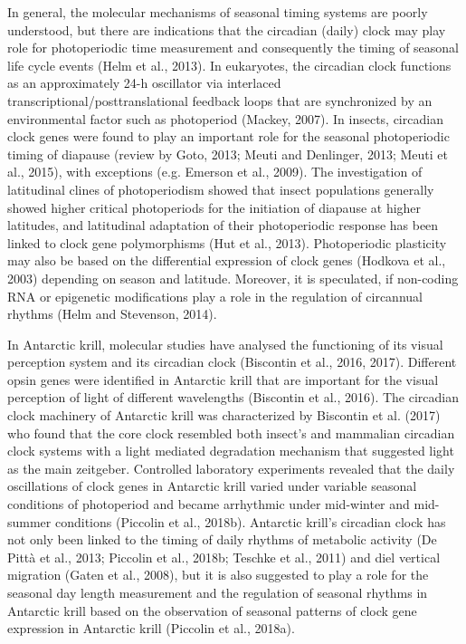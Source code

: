 In general, the molecular mechanisms of seasonal timing systems are poorly understood, but there are indications that the circadian (daily) clock may play role for photoperiodic time measurement and consequently the timing of seasonal life cycle events (Helm et al., 2013). In eukaryotes, the circadian clock functions as an approximately 24-h oscillator via interlaced transcriptional/posttranslational feedback loops that are synchronized by an environmental factor such as photoperiod (Mackey, 2007). In insects, circadian clock genes were found to play an important role for the seasonal photoperiodic timing of diapause (review by Goto, 2013; Meuti and Denlinger, 2013; Meuti et al., 2015), with exceptions (e.g. Emerson et al., 2009). The investigation of latitudinal clines of photoperiodism showed that insect populations generally showed higher critical photoperiods for the initiation of diapause at higher latitudes, and latitudinal adaptation of their photoperiodic response has been linked to clock gene polymorphisms (Hut et al., 2013). Photoperiodic plasticity may also be based on the differential expression of clock genes (Hodkova et al., 2003) depending on season and latitude. Moreover, it is speculated, if non-coding RNA or epigenetic modifications play a role in the regulation of circannual rhythms (Helm and Stevenson, 2014).

In Antarctic krill, molecular studies have analysed the functioning of its visual perception system and its circadian clock (Biscontin et al., 2016, 2017). Different opsin genes were identified in Antarctic krill that are important for the visual perception of light of different wavelengths (Biscontin et al., 2016). The circadian clock machinery of Antarctic krill was characterized by Biscontin et al. (2017) who found that the core clock resembled both insect's and mammalian circadian clock systems with a light mediated degradation mechanism that suggested light as the main zeitgeber. Controlled laboratory experiments revealed that the daily oscillations of clock genes in Antarctic krill varied under variable seasonal conditions of photoperiod and became arrhythmic under mid-winter and mid-summer conditions (Piccolin et al., 2018b). Antarctic krill's circadian clock has not only been linked to the timing of daily rhythms of metabolic activity (De Pittà et al., 2013; Piccolin et al., 2018b; Teschke et al., 2011) and diel vertical migration (Gaten et al., 2008), but it is also suggested to play a role for the seasonal day length measurement and the regulation of seasonal rhythms in Antarctic krill based on the observation of seasonal patterns of clock gene expression in Antarctic krill (Piccolin et al., 2018a). 

